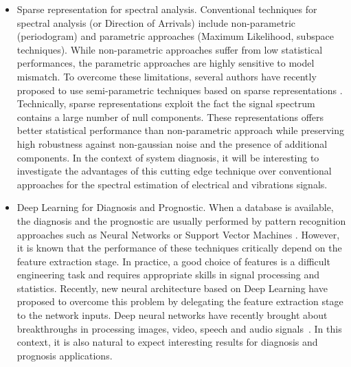 \documentclass{article}
\begin{document}
\begin{itemize}
\item Sparse representation for spectral analysis. Conventional techniques for spectral analysis (or Direction of Arrivals) include non-parametric (periodogram) and parametric approaches (Maximum Likelihood, subspace techniques). While non-parametric approaches suffer from low statistical performances, the parametric approaches are highly sensitive to model mismatch. To overcome these limitations, several authors have recently proposed to use semi-parametric techniques based on sparse representations  \cite{BHA13,TAN13,YAN16}. Technically, sparse representations exploit the fact the signal spectrum contains a large number of null components. These representations offers better statistical performance than non-parametric approach while preserving high robustness against non-gaussian noise and the presence of additional components. In the context of system diagnosis, it will be interesting to investigate the advantages of this cutting edge technique over conventional approaches for the spectral estimation of electrical and vibrations signals. 

\item Deep Learning for Diagnosis and Prognostic. When a database is available, the diagnosis and the prognostic are usually performed by pattern recognition approaches such as Neural Networks or Support Vector Machines \cite{BIS06}. However, it is known that the performance of these techniques critically depend on the feature extraction stage. In practice, a good choice of features is a difficult engineering task and requires appropriate skills in signal processing and statistics. Recently, new neural architecture based on Deep Learning have proposed to overcome this problem by delegating the feature extraction stage to the network inputs. Deep neural networks have recently brought about breakthroughs in processing images, video, speech and audio signals~\cite{LECUN15}. In this context, it is also natural to expect interesting results for diagnosis and prognosis applications.

\end{itemize}



   
 
\end{document}
